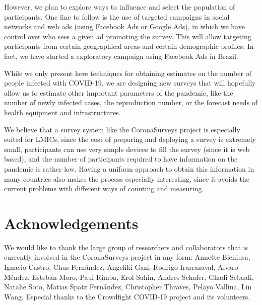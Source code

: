 \documentclass{article}
\newcommand{\af}[1]{{#1}}
\begin{document}
However, we plan to explore ways to influence \af{and select} the population of participants. One line to follow is the use of targeted campaigns in social networks and web ads (using Facebook Ads or Google Ads), in which we have control over who sees a given ad promoting the survey. This will allow targeting participants from certain geographical areas and certain demographic profiles. \af{In fact, we have started a exploratory campaign using Facebook Ads in Brazil.}

While we only present here techniques for obtaining estimates on the number of people infected with COVID-19, we are designing new surveys that will hopefully allow us to estimate other important parameters of the pandemic, like the number of newly infected cases, the reproduction number, or the forecast needs of health equipment and infrastructures.

We believe that a survey system like the CoronaSurveys project is especially suited for LMICs, since the cost of preparing and deploying a survey is extremely small, participants can use very simple devices to fill the survey (since it is web based), and the number of participants required to have information on the pandemic is rather low. Having a uniform approach to obtain this information in many countries also makes the process especially interesting, since it avoids the current problems with different ways of counting and measuring. 


\section{Acknowledgements}

We would like to thank the large group of researchers and collaborators that is currently involved in the CoronaSurveys project in any form: 
Annette Bieniusa,
Ignacio Castro, 
Chus Fernández,
Angeliki Gazi, 
Rodrigo Irarrazaval,
Alvaro Méndez,
Esteban Moro,
Paul Rimba,
Erol Sahin,
Andres Schafer,
Ghadi Sebaali,
Natalie Soto,
Matias Spatz Fernández,
Christopher Thraves, 
Pelayo Vallina, 
Lin Wang. Especial thanks to the Crowdfight COVID-19 project \cite{crowdfight} and its volunteers.






\end{document}
